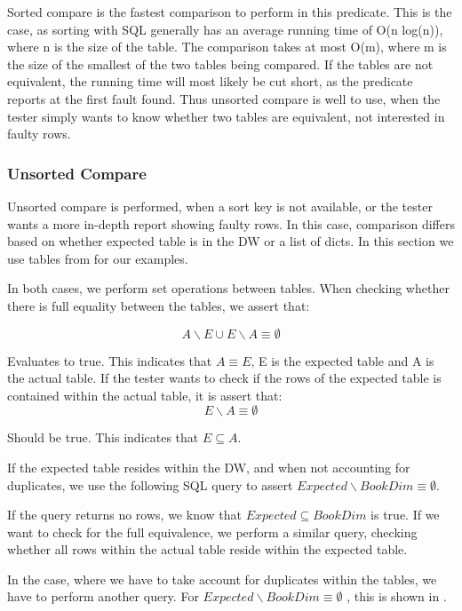 Sorted compare is the fastest comparison to perform in this predicate. This is the case, as sorting with SQL generally has an average running time of O(n log(n)), where n is the size of the table. The comparison takes at most O(m), where m is the size of the smallest of the two tables being compared. If the tables are not equivalent, the running time will most likely be cut short, as the predicate reports at the first fault found. Thus unsorted compare is well to use, when the tester simply wants to know whether two tables are equivalent, not interested in faulty rows.



\subsubsection{Unsorted Compare}
Unsorted compare is performed, when a sort key is not available, or the tester wants a more in-depth report showing faulty rows. In this case, comparison differs based on whether expected table is in the DW or a list of dicts. In this section we use tables from  for our examples.

In both cases, we perform set operations between tables. When checking whether there is full equality between the tables, we assert that:

\[ A \backslash E \cup E \backslash A \equiv \emptyset \]

Evaluates to true. This indicates that $A \equiv E$, E is the expected table and A is the actual table. If the tester wants to check if the rows of the expected table is contained within the actual table, it is assert that:
\[ E \backslash A \equiv \emptyset \]

Should be true. This indicates that $E \subseteq A$.

If the expected table resides within the DW, and when not accounting for duplicates, we use the following SQL query to assert $Expected \backslash BookDim \equiv \emptyset $.


If the query returns no rows, we know that $Expected \subseteq BookDim$ is true. If we want to check for the full equivalence, we perform a similar query, checking whether all rows within the actual table reside within the expected table.

In the case, where we have to take account for duplicates within the tables, we have to perform another query. For $Expected \backslash BookDim \equiv \emptyset$ , this is shown in .

